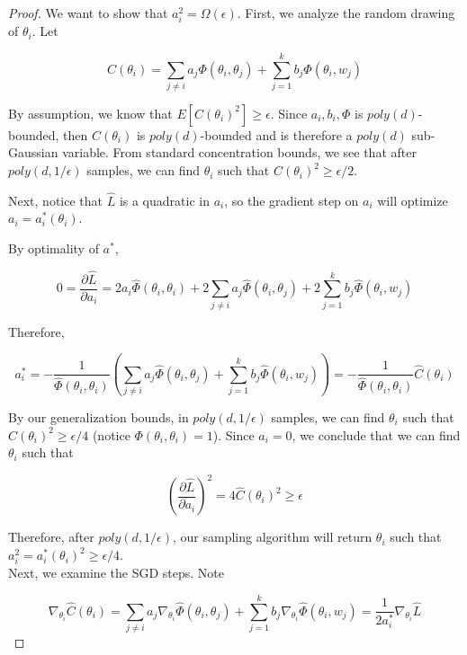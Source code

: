 \documentclass[11pt]{article}
\newcommand{\pd}[2]{\frac{\partial#1}{\partial#2}}
\begin{document}
\begin{proof}
We want to show that $a_i^2 = \Omega(\epsilon)$. First, we analyze the random drawing of $\theta_i$. Let 

\[  C(\theta_i) = \sum_{j\neq i} a_j \Phi(\theta_i,\theta_j) + \sum_{j=1}^k b_j \Phi(\theta_i,w_j)\]

By assumption, we know that $E[C(\theta_i)^2] \geq \epsilon$. Since $a_i,b_i, \Phi$ is $poly(d)$-bounded, then $C(\theta_i)$ is $poly(d)$-bounded and is therefore a $poly(d)$ sub-Gaussian variable. From standard concentration bounds, we see that after $poly(d,1/\epsilon)$ samples, we can find $\theta_i$ such that $C(\theta_i)^2 \geq \epsilon/2$. 


Next, notice that $\hat{L}$ is a quadratic in $a_i$, so the gradient step on $a_i$ will optimize $a_i = a_i^*(\theta_i)$. 

By optimality of $a^*$, 

\begin{equation}
0 = \pd{\hat{L}}{a_i} = 2a_i \widehat{\Phi}(\theta_i,\theta_i) + 2\sum_{j\neq i} a_j \widehat{\Phi}(\theta_i,\theta_j) + 2\sum_{j=1}^k b_j \widehat{\Phi}(\theta_i,w_j)
\end{equation} 

Therefore, 

\[ a_i^* = - \frac{1}{\widehat{\Phi}(\theta_i,\theta_i)} (\sum_{j\neq i} a_j \widehat{\Phi}(\theta_i,\theta_j) + \sum_{j=1}^k b_j \widehat{\Phi}(\theta_i,w_j)) = -\frac{1}{\widehat{\Phi}(\theta_i,\theta_i)}\widehat{C}(\theta_i) \]


By our generalization bounds, in $poly(d,1/\epsilon)$ samples, we can find $\theta_i$ such that $\widehat{C}(\theta_i)^2 \geq \epsilon/4$ (notice $\Phi(\theta_i,\theta_i) = 1$). Since $a_i = 0$, we conclude that we can find $\theta_i$ such that 

\[(\pd{\hat{L}}{a_i})^2 = 4 \widehat{C}(\theta_i)^2 \geq \epsilon\]

Therefore, after $poly(d,1/\epsilon)$, our sampling algorithm will return $\theta_i$ such that $a_i^2 = a_i^*(\theta_i)^2 \geq \epsilon /4$. \\

Next, we examine the SGD steps. Note

\begin{equation}
\nabla_{\theta_i} \widehat{C}(\theta_i) =  \sum_{j\neq i} a_j \nabla_{\theta_i}\widehat{\Phi}(\theta_i,\theta_j) + \sum_{j=1}^k b_j \nabla_{\theta_i}\widehat{\Phi}(\theta_i,w_j) = \frac{1}{2a_i^*} \nabla_{\theta_i}\widehat{L}
\end{equation}


\end{proof}
\end{document}
